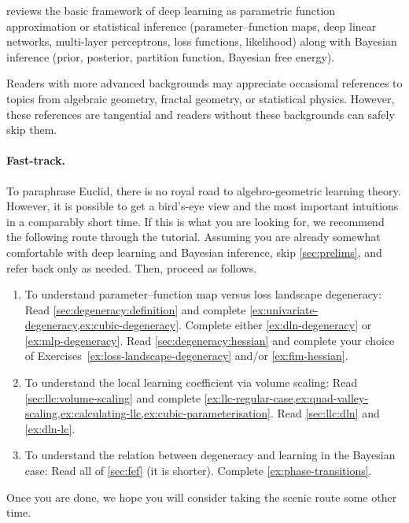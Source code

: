 \documentclass[11pt]{article}
\begin{document}
 reviews the basic framework of deep learning as parametric
function approximation or statistical inference (parameter--function maps, deep
linear networks, multi-layer perceptrons, loss functions, likelihood) along
with Bayesian inference (prior, posterior, partition function, Bayesian free
energy).

Readers with more advanced backgrounds may appreciate occasional references to
topics from algebraic geometry, fractal geometry, or statistical physics.
However, these references are tangential and readers without these backgrounds
can safely skip them.

\paragraph{Fast-track.}

To paraphrase Euclid, there is no royal road to algebro-geometric learning
theory. However, it is possible to get a bird's-eye view and the most important
intuitions in a comparably short time. If this is what you are looking for, we
recommend the following route through the tutorial. Assuming you are already
somewhat comfortable with deep learning and Bayesian inference, skip
\cref{sec:prelims}, and refer back only as needed. Then, proceed as follows.
\begin{enumerate}
    \item
        To understand parameter--function map versus loss landscape degeneracy:
        Read \cref{sec:degeneracy:definition} and complete
        \cref{ex:univariate-degeneracy,ex:cubic-degeneracy}.
        Complete either \cref{ex:dln-degeneracy} or \ref{ex:mlp-degeneracy}.
        Read \cref{sec:degeneracy:hessian} and complete your choice of
            Exercises~\ref{ex:loss-landscape-degeneracy} and/or \ref{ex:fim-hessian}.
    \item
        To understand the local learning coefficient via volume scaling:
        Read \cref{sec:llc:volume-scaling} and complete
        \cref{ex:llc-regular-case,ex:quad-valley-scaling,ex:calculating-llc,ex:cubic-parameterisation}.
        Read \cref{sec:llc:dln} and \cref{ex:dln-lc}.
    \item
        To understand the relation between degeneracy and learning in the
        Bayesian case:
        Read all of \cref{sec:fef} (it is shorter).
        Complete \cref{ex:phase-transitions}.
\end{enumerate}
Once you are done, we hope you will consider taking the scenic route some other
time.
\end{document}
